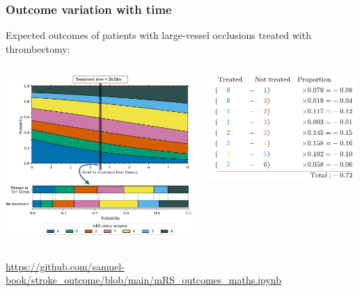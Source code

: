 \documentclass[xcolor={usenames,dvipsnames}]{beamer}
\newcommand{\smallurl}[1]{\textcolor{blue}{\fontsize{4pt}{4.8pt}\selectfont \url{#1}}}
\begin{document}
\begin{frame}
\frametitle{Outcome variation with time}

\footnotesize{Expected outcomes of patients with large-vessel occlusions treated with thrombectomy:} 

\begin{columns}
    \begin{center} 
    \includegraphics[width=\textwidth]{./images/dist_treatment_time}
    \end{center} 
    
    \begin{center} 
    \includegraphics[width=\textwidth]{./images/outcome_sums_mRS}
    \end{center} 
\end{columns}



\vspace{2em}
\smallurl{https://github.com/samuel-book/stroke_outcome/blob/main/mRS_outcomes_maths.ipynb}


\end{frame}
\end{document}
